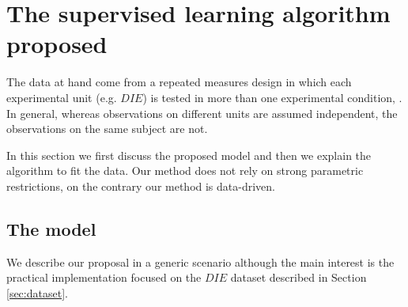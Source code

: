 \documentclass[sn-mathphys]{sn-jnl}%
\theoremstyle{thmstyleone}%
\theoremstyle{thmstyletwo}%
\theoremstyle{thmstylethree}%
\begin{document}
\section{The supervised learning algorithm proposed}\label{sec:model}


\noindent The data at hand come from a repeated measures design in which each experimental unit (e.g. $DIE$) is tested in more than one experimental condition, \cite{BHN2000}. In general, whereas observations on different units are assumed independent, the observations on the same subject are not. 

In this section we first discuss the proposed model and then we explain the algorithm to fit the data. Our method does not rely on strong parametric restrictions, on the contrary our method is data-driven. 


\subsection{The model}

\noindent We describe our proposal in a generic scenario although the main interest is the practical implementation  focused on the $DIE$ dataset described in Section \ref{sec:dataset}.\ 
\end{document}
